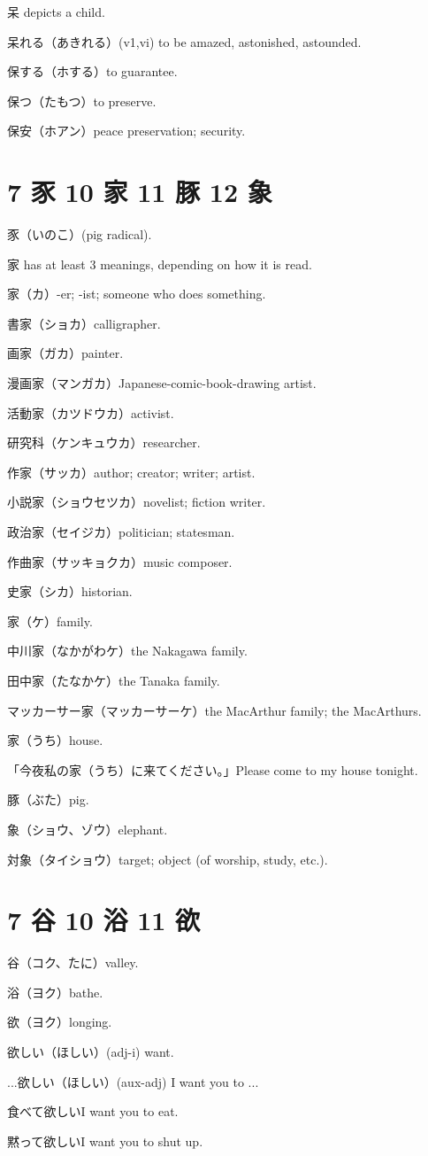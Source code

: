 呆 depicts a child.

呆れる（あきれる）(v1,vi) to be amazed, astonished, astounded.

保する（ホする）to guarantee.

保つ（たもつ）to preserve.

保安（ホアン）peace preservation; security.

\section{7 豕 10 家 11 豚 12 象}

豕（いのこ）(pig radical).

家 has at least 3 meanings, depending on how it is read.

家（カ）-er; -ist; someone who does something.

書家（ショカ）calligrapher.

画家（ガカ）painter.

漫画家（マンガカ）Japanese-comic-book-drawing artist.

活動家（カツドウカ）activist.

研究科（ケンキュウカ）researcher.

作家（サッカ）author; creator; writer; artist.

小説家（ショウセツカ）novelist; fiction writer.

政治家（セイジカ）politician; statesman.

作曲家（サッキョクカ）music composer.

史家（シカ）historian.

家（ケ）family.

中川家（なかがわケ）the Nakagawa family.

田中家（たなかケ）the Tanaka family.

マッカーサー家（マッカーサーケ）the MacArthur family; the MacArthurs.

家（うち）house.

「今夜私の家（うち）に来てください。」Please come to my house tonight.

豚（ぶた）pig.

象（ショウ、ゾウ）elephant.

対象（タイショウ）target; object (of worship, study, etc.).

\section{7 谷 10 浴 11 欲}

谷（コク、たに）valley.

浴（ヨク）bathe.

欲（ヨク）longing.

欲しい（ほしい）(adj-i) want.

...欲しい（ほしい）(aux-adj) I want you to ...

食べて欲しいI want you to eat.

黙って欲しいI want you to shut up.
